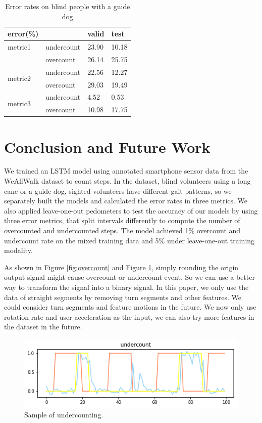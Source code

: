 \documentclass[11pt]{article}
\begin{document}
\begin{table}[]
\centering
\caption{Error rates on blind people with a guide dog}
\label{my-label}
\begin{tabular}{llll}
\hline
error(\%)                &            & valid & test  \\ \hline
metric1                  & undercount & 23.90 & 10.18 \\
                         & overcount  & 26.14 & 25.75 \\ \hline
\multirow{2}{*}{metric2} & undercount & 22.56 & 12.27 \\
                         & overcount  & 29.03 & 19.49 \\ \hline
\multirow{2}{*}{metric3} & undercount & 4.52  & 0.53  \\
                         & overcount  & 10.98 & 17.75 \\ \hline
\end{tabular}
\end{table}


\section{Conclusion and Future Work}

We trained an LSTM model using annotated smartphone sensor data from the WeAllWalk dataset to count steps. In the dataset, blind volunteers using a long cane or a guide dog, sighted volunteers have different gait patterns, so we separately built the models and calculated the error rates in three metrics. We also applied leave-one-out pedometers to test the accuracy of our models by using three error metrics, that split intervals differently to compute the number of overcounted and undercounted steps. The model achieved 1\% overcount and undercount rate on the mixed training data and 5\% under leave-one-out training modality.

As shown in Figure \ref{fig:overcount} and Figure \ref{fig:undercount}, simply rounding the origin output signal might cause overcount or undercount event. So we can use a better way to transform the signal into a binary signal. In this paper, we only use the data of straight segments by removing turn segments and other features. We could consider turn segments and feature motions in the future. We now only use rotation rate and user acceleration as the input, we can also try more features in the dataset in the future.

\begin{figure}[ht]
\centering
\includegraphics[scale=0.4]{undercount}
\caption{Sample of undercounting.}
\label{fig:undercount}
\end{figure}
\end{document}
